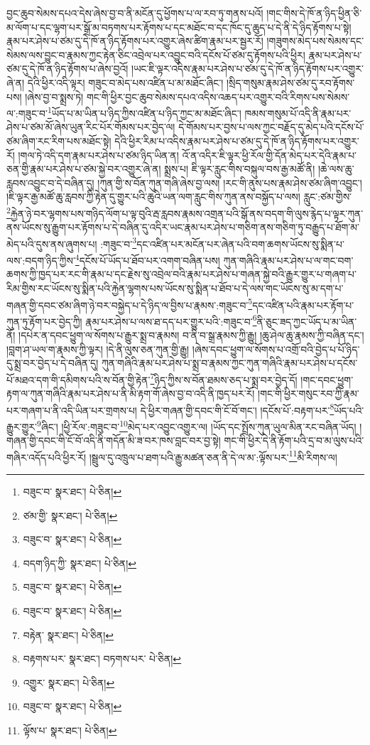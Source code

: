 བྱང་ཆུབ་སེམས་དཔའ་དེས་ཞེས་བྱ་བ་ནི་མངོན་དུ་ཕྱོགས་པ་ལ་རབ་ཏུ་གནས་པའོ། །གང་གིས་དེ་ཁོ་ན་ཉིད་ཕྱིན་ཅི་མ་ལོག་པ་དང་ལྷག་པར་སྒྲོ་མ་བཏགས་པར་རྟོགས་པ་དང་མཐོང་བ་དང་ཁོང་དུ་ཆུད་པ་དེ་ནི་དེ་ཉིད་རྟོགས་པ་སྟེ། རྣམ་པར་ཤེས་པ་ཙམ་དུ་དེ་ཁོ་ན་ཉིད་རྟོགས་པར་འགྱུར་ཞེས་ཚིག་རྣམ་པར་སྦྱར་རོ། །གཟུགས་མེད་པས་སེམས་དང་སེམས་ལས་བྱུང་བ་རྣམས་ཀྱང་རྟེན་ཅིང་འབྲེལ་པར་འབྱུང་བའི་དངོས་པོ་ཙམ་དུ་རྟོགས་པའི་ཕྱིར། རྣམ་པར་ཤེས་པ་ཙམ་དུ་དེ་ཁོ་ན་ཉིད་རྟོགས་པ་ཞེས་བྱའོ། །ཡང་ཇི་ལྟར་འདིས་རྣམ་པར་ཤེས་པ་ཙམ་དུ་དེ་ཁོ་ན་ཉིད་རྟོགས་པར་འགྱུར་ཞེ་ན། དེའི་ཕྱིར་འདི་ལྟར། གཟུང་བ་མེད་པས་འཛིན་པ་མ་མཐོང་ཞིང་། །སྲིད་གསུམ་རྣམ་ཤེས་ཙམ་དུ་རབ་རྟོགས་པས། །ཞེས་བྱ་བ་སྨྲས་ཏེ། གང་གི་ཕྱིར་བྱང་ཆུབ་སེམས་དཔའ་འདིས་འཆད་པར་འགྱུར་བའི་རིགས་པས་སེམས་ལ་:གཟུང་བ་\footnote{བཟུང་བ་  སྣར་ཐང་།  པེ་ཅིན། }ཡོད་པ་མ་ཡིན་པ་ཉིད་ཀྱིས་འཛིན་པ་ཉིད་ཀྱང་མ་མཐོང་ཞིང་། ཁམས་གསུམ་པོ་འདི་ནི་རྣམ་པར་ཤེས་པ་ཙམ་མོ་ཞེས་ཡུན་རིང་པོར་གོམས་པར་བྱེད་ལ། དེ་གོམས་པར་བྱས་པ་ལས་ཀྱང་བརྗོད་དུ་མེད་པའི་དངོས་པོ་ཙམ་ཞིག་རང་རིག་པས་མཐོང་སྟེ། དེའི་ཕྱིར་རིམ་པ་འདིས་རྣམ་པར་ཤེས་པ་ཙམ་དུ་དེ་ཁོ་ན་ཉིད་རྟོགས་པར་འགྱུར་རོ། །གལ་ཏེ་འདི་དག་རྣམ་པར་ཤེས་པ་ཙམ་ཉིད་ཡིན་ན། འོ་ན་འདིར་ཇི་ལྟར་ཕྱི་རོལ་གྱི་དོན་མེད་པར་དེའི་རྣམ་པ་ཅན་གྱི་རྣམ་པར་ཤེས་པ་ཙམ་སྐྱེ་བར་འགྱུར་ཞེ་ན། སྨྲས་པ། ཇི་ལྟར་རླུང་གིས་བསྐུལ་བས་རྒྱ་མཚོ་ནི། །ཆེ་ལས་ཆུ་རླབས་འབྱུང་བ་དེ་བཞིན་དུ། །ཀུན་གྱི་ས་བོན་ཀུན་གཞི་ཞེས་བྱ་ལས། །རང་གི་ནུས་པས་རྣམ་ཤེས་ཙམ་ཞིག་འབྱུང་། །ཇི་ལྟར་རྒྱ་མཚོ་ཆུ་རླབས་ཀྱི་རྟེན་དུ་གྱུར་པའི་ཆུའི་ཡན་ལག་རླུང་གིས་ཀུན་ནས་བསྐྱོད་པ་ལས། རླུང་:ཙམ་གྱིས་\footnote{ཙམ་གྱི་  སྣར་ཐང་།  པེ་ཅིན། }རྐྱེན་ཉེ་བར་ལྷགས་པས་གཉིད་ལོག་པ་ལྟ་བུའི་རྦ་རླབས་རྣམས་འགྲན་པའི་སྒོ་ནས་བདག་གི་ལུས་རྙེད་པ་ལྟར་ཀུན་ནས་ཡོངས་སུ་རྒྱུག་པར་རྟོགས་པ་དེ་བཞིན་དུ་འདིར་ཡང་རྣམ་པར་ཤེས་པ་གཅིག་ནས་གཅིག་ཏུ་བརྒྱུད་པ་ཐོག་མ་མེད་པའི་དུས་ནས་ཞུགས་པ། :གཟུང་བ་\footnote{བཟུང་བ་  སྣར་ཐང་།  པེ་ཅིན། }དང་འཛིན་པར་མངོན་པར་ཞེན་པའི་བག་ཆགས་ཡོངས་སུ་སྨིན་པ་ལས་:བདག་ཉིད་ཀྱིས་\footnote{བདག་ཉིད་ཀྱི་  སྣར་ཐང་།  པེ་ཅིན། }དངོས་པོ་ཡོད་པ་ཐོབ་པར་འགག་བཞིན་པས། ཀུན་གཞིའི་རྣམ་པར་ཤེས་པ་ལ་གང་བག་ཆགས་ཀྱི་ཁྱད་པར་རང་གི་རྣམ་པ་དང་རྗེས་སུ་འབྲེལ་བའི་རྣམ་པར་ཤེས་པ་གཞན་སྐྱེ་བའི་རྒྱུར་གྱུར་པ་གཞག་པ་རིམ་གྱིས་རང་ཡོངས་སུ་སྨིན་པའི་རྐྱེན་ལྷགས་པས་ཡོངས་སུ་སྨིན་པ་ཐོབ་པ་དེ་ལས་གང་ཡོངས་སུ་མ་དག་པ་གཞན་གྱི་དབང་ཙམ་ཞིག་ཉེ་བར་བསྐྱེད་པ་དེ་ཉིད་ལ་བྱིས་པ་རྣམས་:གཟུང་བ་\footnote{བཟུང་བ་  སྣར་ཐང་།  པེ་ཅིན། }དང་འཛིན་པའི་རྣམ་པར་རྟོག་པ་ཀུན་ཏུ་རྟོག་པར་བྱེད་ཀྱི། རྣམ་པར་ཤེས་པ་ལས་ཐ་དད་པར་གྱུར་པའི་:གཟུང་བ་\footnote{བཟུང་བ་  སྣར་ཐང་།  པེ་ཅིན། }ནི་ཅུང་ཟད་ཀྱང་ཡོད་པ་མ་ཡིན་ནོ། །དཔེར་ན་དབང་ཕྱུག་ལ་སོགས་པ་རྒྱུར་སྨྲ་བ་རྣམས། བ་ནི་བ་སྒྲ་རྣམས་ཀྱི་རྒྱུ། །ཆུ་ཤེལ་ཆུ་རྣམས་ཀྱི་བཞིན་དང་། །བླག་ཤ་ཡལ་ག་རྣམས་ཀྱི་ལྟར། །དེ་ནི་ལུས་ཅན་ཀུན་གྱི་རྒྱུ། །ཞེས་དབང་ཕྱུག་ལ་སོགས་པ་འགྲོ་བའི་བྱེད་པ་པོ་ཉིད་དུ་སྨྲ་བར་བྱེད་པ་དེ་བཞིན་དུ། ཀུན་གཞིའི་རྣམ་པར་ཤེས་པ་སྨྲ་བ་རྣམས་ཀྱང་ཀུན་གཞིའི་རྣམ་པར་ཤེས་པ་དངོས་པོ་མཐའ་དག་གི་དམིགས་པའི་ས་བོན་གྱི་རྟེན་\footnote{བརྟེན་  སྣར་ཐང་།  པེ་ཅིན། }ཉིད་ཀྱིས་ས་བོན་ཐམས་ཅད་པ་སྨྲ་བར་བྱེད་དོ། །གང་དབང་ཕྱུག་རྟག་ལ་ཀུན་གཞིའི་རྣམ་པར་ཤེས་པ་ནི་མི་རྟག་གོ་ཞེས་བྱ་བ་འདི་ནི་ཁྱད་པར་རོ། །གང་གི་ཕྱིར་གསུང་རབ་ཀྱི་རྣམ་པར་གཞག་པ་ནི་འདི་ཡིན་པར་གྲགས་པ། དེ་ཕྱིར་གཞན་གྱི་དབང་གི་ངོ་བོ་གང་། །དངོས་པོ་:བརྟག་པར་\footnote{བརྟགས་པར་  སྣར་ཐང་། བཏགས་པར་  པེ་ཅིན། }ཡོད་པའི་རྒྱུར་གྱུར་\footnote{འགྱུར་  སྣར་ཐང་།  པེ་ཅིན། }ཞིང་། །ཕྱི་རོལ་:གཟུང་བ་\footnote{བཟུང་བ་  སྣར་ཐང་།  པེ་ཅིན། }མེད་པར་འབྱུང་འགྱུར་ལ། །ཡོད་དང་སྤྲོས་ཀུན་ཡུལ་མིན་རང་བཞིན་ཡོད། །གཞན་གྱི་དབང་གི་ངོ་བོ་འདི་ནི་གདོན་མི་ཟ་བར་ཁས་བླང་བར་བྱ་སྟེ། གང་གི་ཕྱིར་དེ་ནི་རྟོག་པའི་དྲ་བ་མ་ལུས་པའི་གཞིར་འདོད་པའི་ཕྱིར་རོ། །སྦྲུལ་དུ་འཁྲུལ་པ་ཐག་པའི་རྒྱུ་མཚན་ཅན་ནི་དེ་ལ་མ་:ལྟོས་པར་\footnote{ལྟོས་པ་  སྣར་ཐང་།  པེ་ཅིན། }མི་རིགས་ལ། 